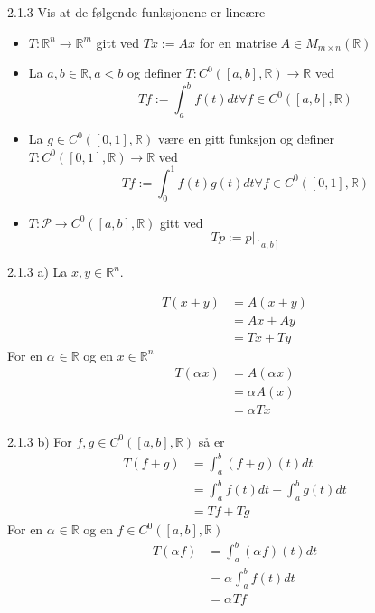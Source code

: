 \documentclass[a4paper,norsk]{article}
\begin{document}
\begin{oppgavebox}{2.1.3}{}
Vis at de følgende funksjonene er lineære
\begin{itemize}
    \item $ T: \mathbb{R}^n \rightarrow \mathbb{R}^m $ gitt ved $ Tx := Ax $ for en matrise $ A \in M_{m \times n} (\mathbb{R}) $ 
    \item La $ a, b \in \mathbb{R}, a < b $ og definer $ T: C^0 \left( \left[ a, b \right] , \mathbb{R} \right) \rightarrow \mathbb{R}  $ ved
    \[
        Tf := \int_{a}^{b} f(t) dt \forall f \in C^0 \left( \left[ a, b \right], \mathbb{R}  \right)  
    \]
    \item La $ g \in C^0 \left(  \left[ 0, 1 \right] , \mathbb{R} \right)  $ være en gitt funksjon og definer $ T: C^0 \left(  \left[ 0, 1 \right] , \mathbb{R} \right) \rightarrow \mathbb{R}  $ ved
    \[
        Tf := \int_{0}^{1} f(t) g(t) dt \forall f \in C^0 \left( \left[ 0, 1 \right] , \mathbb{R} \right)       
    \]
    \item $ T: \mathcal{P} \rightarrow C^0 \left( \left[ a, b \right] , \mathbb{R} \right)  $ gitt ved
    \[
        Tp := p|_{ \left[ a, b \right] }
    \]
\end{itemize}

\begin{proofbox}{2.1.3 a)}{}
La $ x, y \in \mathbb{R}^n $. 

\begin{align*}
    T \left( x + y \right) &= A \left( x + y \right) \\
    &= Ax + Ay \\
    &= Tx + Ty
\end{align*}
For en $ \alpha_{}^{} \in  \mathbb{R} $ og en $ x \in \mathbb{R}^n $  
\begin{align*}
    T \left( \alpha_{}^{} x \right)  &= A \left( \alpha_{}^{} x \right)    \\
    &= \alpha_{}^{} A \left( x \right) \\
    &= \alpha_{}^{} Tx
\end{align*}
\end{proofbox}

\begin{proofbox}{2.1.3 b)}{}
For $ f, g \in C^0 \left( \left[ a, b \right] , \mathbb{R} \right)  $ så er
\begin{align*}
    T \left( f + g \right) &= \int_{a}^{b} \left( f + g \right) \left( t \right)  dt \\
    &= \int_{a}^{b} f(t) dt + \int_{a}^{b} g(t) dt \\
    &= Tf + Tg   
\end{align*}
For en $ \alpha_{}^{} \in \mathbb{R} $ og en $ f \in C^0 \left( \left[ a, b \right] , \mathbb{R} \right) $
\begin{align*}
    T \left( \alpha_{}^{} f \right) &= \int_{a}^{b} \left( \alpha_{}^{} f \right) \left( t \right) dt \\
    &= \alpha_{}^{} \int_{a}^{b} f(t) dt \\
    &= \alpha_{}^{} Tf  
\end{align*}
\end{proofbox}


\end{oppgavebox}
\end{document}
